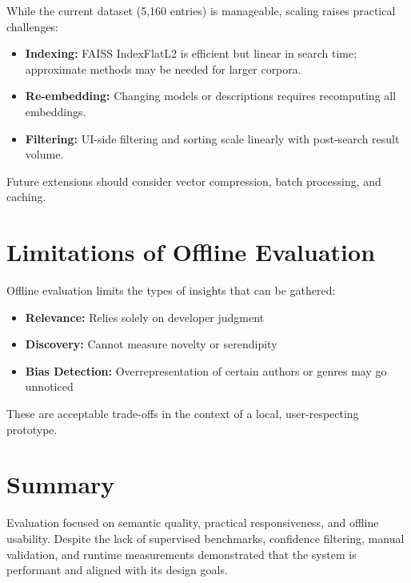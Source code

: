 While the current dataset (5,160 entries) is manageable, scaling raises practical challenges:

\begin{itemize}
    \item \textbf{Indexing:} FAISS IndexFlatL2 is efficient but linear in search time; approximate methods may be needed for larger corpora.
    \item \textbf{Re-embedding:} Changing models or descriptions requires recomputing all embeddings.
    \item \textbf{Filtering:} UI-side filtering and sorting scale linearly with post-search result volume.
\end{itemize}

Future extensions should consider vector compression, batch processing, and caching.

\section{Limitations of Offline Evaluation}
\label{sec:limitations}

Offline evaluation limits the types of insights that can be gathered:

\begin{itemize}
    \item \textbf{Relevance:} Relies solely on developer judgment
    \item \textbf{Discovery:} Cannot measure novelty or serendipity
    \item \textbf{Bias Detection:} Overrepresentation of certain authors or genres may go unnoticed
\end{itemize}

These are acceptable trade-offs in the context of a local, user-respecting prototype.

\section{Summary}
\label{sec:performance-summary}

Evaluation focused on semantic quality, practical responsiveness, and offline usability. Despite the lack of supervised benchmarks, confidence filtering, manual validation, and runtime measurements demonstrated that the system is performant and aligned with its design goals.
